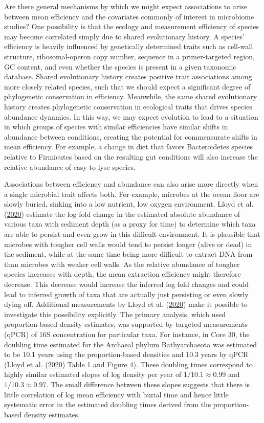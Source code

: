 \documentclass[
]{article}
\begin{document}
Are there general mechanisms by which we might expect associations to arise between mean efficiency and the covariates commonly of interest in microbiome studies?
One possibility is that the ecology and measurement efficiency of species may become correlated simply due to shared evolutionary history.
A species' efficiency is heavily influenced by genetically determined traits such as cell-wall structure, ribosomal-operon copy number, sequence in a primer-targeted region, GC content, and even whether the species is present in a given taxonomic database.
Shared evolutionary history creates positive trait associations among more closely related species, such that we should expect a significant degree of phylogenetic conservation in efficiency.
Meanwhile, the same shared evolutionary history creates phylogenetic conservation in ecological traits that drives species abundance dynamics.
In this way, we may expect evolution to lead to a situation in which groups of species with similar efficiencies have similar shifts in abundance between conditions, creating the potential for commensurate shifts in mean efficiency.
For example, a change in diet that favors Bacteroidetes species relative to Firmicutes based on the resulting gut conditions will also increase the relative abundance of easy-to-lyse species.

Associations between efficiency and abundance can also arise more directly when a single microbial trait affects both.
For example, microbes at the ocean floor are slowly buried, sinking into a low nutrient, low oxygen environment.
Lloyd et al. (\protect\hyperlink{ref-lloyd2020evid}{2020}) estimate the log fold change in the estimated absolute abundance of various taxa with sediment depth (as a proxy for time) to determine which taxa are able to persist and even grow in this difficult environment.
It is plausible that microbes with tougher cell walls would tend to persist longer (alive or dead) in the sediment, while at the same time being more difficult to extract DNA from than microbes with weaker cell walls.
As the relative abundance of tougher species increases with depth, the mean extraction efficiency might therefore decrease.
This decrease would increase the inferred log fold changes and could lead to inferred growth of taxa that are actually just persisting or even slowly dying off.
Additional measurements by Lloyd et al. (\protect\hyperlink{ref-lloyd2020evid}{2020}) make it possible to investigate this possibility explicitly.
The primary analysis, which used proportion-based density estimates, was supported by targeted measurements (qPCR) of 16S concentration for particular taxa.
For instance, in Core 30, the doubling time estimated for the Archaeal phylum Bathyarchaeota was estimated to be 10.1 years using the proportion-based densities and 10.3 years by qPCR (Lloyd et al. (\protect\hyperlink{ref-lloyd2020evid}{2020}) Table 1 and Figure 4).
These doubling times correspond to highly similar estimated slopes of log density per year of \(1/10.1 \approx 0.99\) and \(1/10.3\approx 0.97\).
The small difference between these slopes suggests that there is little correlation of log mean efficiency with burial time and hence little systematic error in the estimated doubling times derived from the proportion-based density estimates.
\end{document}
